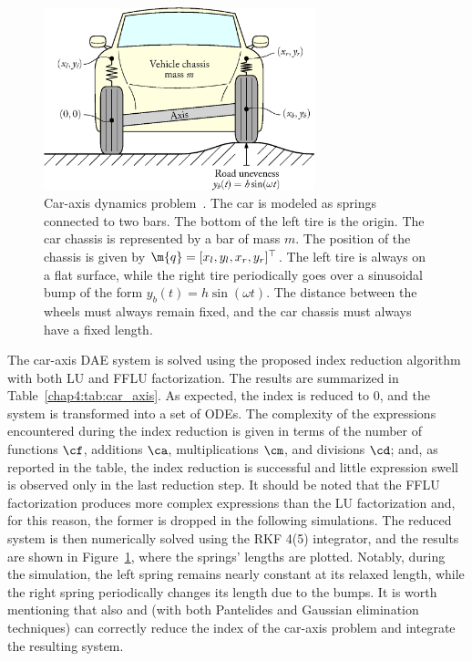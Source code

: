 \begin{figure}
  \centering
  \includegraphics[width=0.7\textwidth]{figures/chapter_4/car_axis}
  \caption{Car-axis dynamics problem~\cite{lioen1998test, mazzia2008test}. The car is modeled as springs connected to two bars. The bottom of the left tire is the origin. The car chassis is represented by a bar of mass $m$. The position of the chassis is given by $\m{q} = [x_l, y_l, x_r, y_r]^\top$. The left tire is always on a flat surface, while the right tire periodically goes over a sinusoidal bump of the form $y_b(t) = h\sin(\omega t)$. The distance between the wheels must always remain fixed, and the car chassis must always have a fixed length.}
  \label{chap4:fig:car_axis}
\end{figure}

The car-axis \ac{DAE} system is solved using the proposed index reduction algorithm with both \ac{LU} and \ac{FFLU} factorization. The results are summarized in Table~\ref{chap4:tab:car_axis}. As expected, the index is reduced to 0, and the system is transformed into a set of \acp{ODE}. The complexity of the expressions encountered during the index reduction is given in terms of the number of functions $\cf$, additions $\ca$, multiplications $\cm$, and divisions $\cd$; and, as reported in the table, the index reduction is successful and little expression swell is observed only in the last reduction step. It should be noted that the \ac{FFLU} factorization produces more complex expressions than the \ac{LU} factorization and, for this reason, the former is dropped in the following simulations. The reduced system is then numerically solved using the \ac{RKF} 4(5) integrator, and the results are shown in Figure~\ref{chap4:fig:car_axis}, where the springs' lengths are plotted. Notably, during the simulation, the left spring remains nearly constant at its relaxed length, while the right spring periodically changes its length due to the bumps. It is worth mentioning that also \Mathematica{} and \Matlab{} (with both Pantelides and Gaussian elimination techniques) can correctly reduce the index of the car-axis problem and integrate the resulting system.

